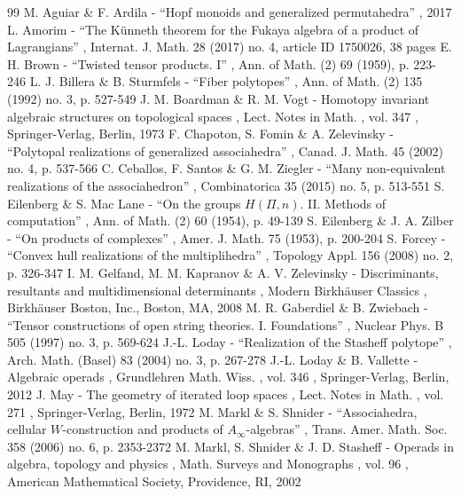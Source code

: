 \documentclass[11pt]{article}
\numberwithin{equation}{section}\providecommand{\No}{}
\theoremstyle{plain}
\theoremstyle{definition}
\begin{document}
\begin{thebibliography}{99}
 M. Aguiar \& F. Ardila - “Hopf monoids and generalized permutahedra” , 2017
 L. Amorim - “The Künneth theorem for the Fukaya algebra of a product of Lagrangians” , Internat. J. Math. 28 (2017) no. 4, article ID 1750026, 38 pages
 E. H. Brown - “Twisted tensor products. I” , Ann. of Math. (2) 69 (1959), p. 223-246
 L. J. Billera \& B. Sturmfels - “Fiber polytopes” , Ann. of Math. (2) 135 (1992) no. 3, p. 527-549
 J. M. Boardman \& R. M. Vogt - Homotopy invariant algebraic structures on topological spaces , Lect. Notes in Math. , vol. 347 , Springer-Verlag, Berlin, 1973
 F. Chapoton, S. Fomin \& A. Zelevinsky - “Polytopal realizations of generalized associahedra” , Canad. J. Math. 45 (2002) no. 4, p. 537-566
 C. Ceballos, F. Santos \& G. M. Ziegler - “Many non-equivalent realizations of the associahedron” , Combinatorica 35 (2015) no. 5, p. 513-551
 S. Eilenberg \& S. Mac Lane - “On the groups $H(\Pi ,n)$. II. Methods of computation” , Ann. of Math. (2) 60 (1954), p. 49-139
 S. Eilenberg \& J. A. Zilber - “On products of complexes” , Amer. J. Math. 75 (1953), p. 200-204
 S. Forcey - “Convex hull realizations of the multiplihedra” , Topology Appl. 156 (2008) no. 2, p. 326-347
 I. M. Gelfand, M. M. Kapranov \& A. V. Zelevinsky - Discriminants, resultants and multidimensional determinants , Modern Birkhäuser Classics , Birkhäuser Boston, Inc., Boston, MA, 2008
 M. R. Gaberdiel \& B. Zwiebach - “Tensor constructions of open string theories. I. Foundations” , Nuclear Phys. B 505 (1997) no. 3, p. 569-624
 J.-L. Loday - “Realization of the Stasheff polytope” , Arch. Math. (Basel) 83 (2004) no. 3, p. 267-278
 J.-L. Loday \& B. Vallette - Algebraic operads , Grundlehren Math. Wiss. , vol. 346 , Springer-Verlag, Berlin, 2012
 J. May - The geometry of iterated loop spaces , Lect. Notes in Math. , vol. 271 , Springer-Verlag, Berlin, 1972
 M. Markl \& S. Shnider - “Associahedra, cellular $W$-construction and products of $A_\infty $-algebras” , Trans. Amer. Math. Soc. 358 (2006) no. 6, p. 2353-2372
 M. Markl, S. Shnider \& J. D. Stasheff - Operads in algebra, topology and physics , Math. Surveys and Monographs , vol. 96 , American Mathematical Society, Providence, RI, 2002

\end{thebibliography}
\end{document}
